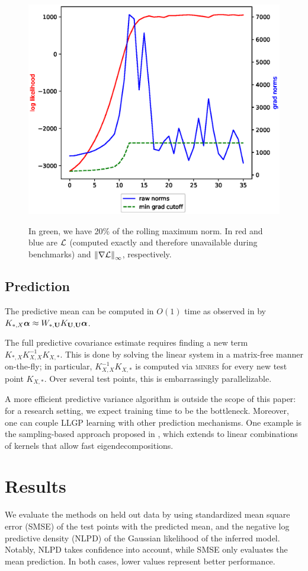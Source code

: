 \documentclass{article}
\begin{document}
\begin{figure}[!h]
\centering
{\includegraphics[width=0.5\columnwidth]{running_cutoff.eps}}
\caption{In green, we have 20\% of the rolling maximum norm. In red and blue are $\mathcal{L}$ (computed exactly and therefore unavailable during benchmarks) and $ \left\| \nabla\mathcal{L} \right\|_\infty $, respectively. }
\label{fx2007-stop}
\end{figure}

\subsection{Prediction}

The predictive mean can be computed in $O(1)$ time as observed in \cite{msgp} by $K_{*,X}{\boldsymbol\alpha}\approx W_{*,\textbf{U}}K_{\textbf{U},\textbf{U}}{\boldsymbol\alpha}$.

The full predictive covariance estimate requires finding a new term $K_{*,X}K_{X,X}^{-1}K_{X,*}$. This is done by solving the linear system in a matrix-free manner on-the-fly; in particular, $K_{X,X}^{-1}K_{X,*}$ is computed via \textsc{minres} for every new test point $K_{X,*}$. Over several test points, this is embarrassingly parallelizable.

A more efficient predictive variance algorithm is outside the scope of this paper: for a research setting, we expect training time to be the bottleneck. Moreover, one can couple LLGP learning with other prediction mechanisms. One example is the sampling-based approach proposed in \cite{papandreou2011efficient}, which extends to linear combinations of kernels that allow fast eigendecompositions.

\section{Results}
\label{sec:results}
We evaluate the methods on held out data by using standardized mean square error (SMSE) of the test points with the predicted mean, and the negative log predictive density (NLPD) of the Gaussian likelihood of the inferred model. Notably, NLPD takes confidence into account, while SMSE only evaluates the mean prediction. In both cases, lower values represent better performance. 
\end{document}
